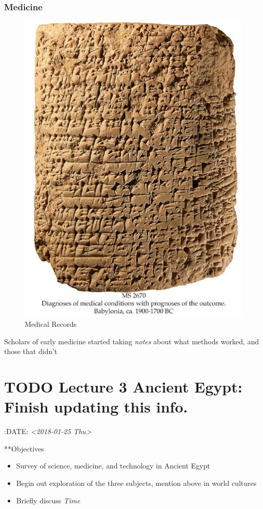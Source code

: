 \documentclass[11pt]{article}
\begin{document}
\subsubsection{Medicine}
\label{sec-3-8-6}
\begin{figure}[htb]
\centering
\includegraphics[width=.9\linewidth]{./img/MedRecs.png}
\caption{Medical Records}
\end{figure}

Scholars of early medicine started taking \emph{notes} about what methods worked, and those that didn't


\section{{\bfseries\sffamily TODO} Lecture 3 Ancient Egypt: Finish updating this info.}
\label{sec-4}
:DATE: \textit{<2018-01-25 Thu>}

**Objectives
\begin{itemize}
\item Survey of science, medicine, and technology in Ancient Egypt

\item Begin out exploration of the three subjects, mention above in world cultures

\item Briefly discuss \emph{Time}
\end{itemize}
\end{document}
